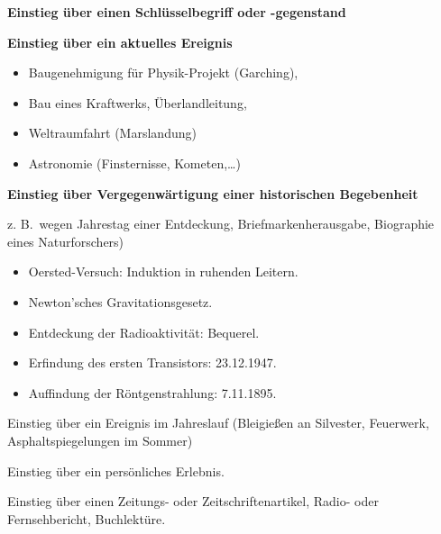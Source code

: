 \begin{itemize}
	
	\item {\bf 	Einstieg \"{u}ber einen Schl\"{u}sselbegriff oder -gegenstand}
	
	\item {\bf 	Einstieg \"{u}ber ein aktuelles Ereignis}
	\begin{beisp2}
			\begin{itemize}
	\item
	Baugenehmigung f\"{u}r Physik-Projekt (Garching),
	\item
	Bau eines Kraftwerks, \"{U}berlandleitung,
	\item
	Weltraumfahrt (Marslandung)
	\item
	Astronomie (Finsternisse, Kometen,\dots)
	\end{itemize}
	\end{beisp2}

	
	\item {\bf 	Einstieg \"{u}ber Vergegenw\"{a}rtigung einer historischen Begebenheit}
	\begin{beisp2}
		z. B.\ wegen Jahrestag einer Entdeckung, Briefmarkenherausgabe,
	Biographie eines Naturforschers)
				\begin{itemize}
	\item
	Oersted-Versuch: Induktion in ruhenden Leitern.
	\item
	Newton'sches Gravitationsgesetz.
	\item
	Entdeckung der Radioaktivit\"{a}t: Bequerel.
	\item
	Erfindung des ersten Transistors: 23.12.1947.
	\item
	Auffindung der R\"{o}ntgenstrahlung: 7.11.1895.
	\end{itemize}
	\end{beisp2}
	

	{\bf
	\item
	Einstieg \"{u}ber ein Ereignis im Jahreslauf
	(Bleigie{\ss}en an Silvester, Feuerwerk, Asphaltspiegelungen im Sommer)
	
	\item
	Einstieg \"{u}ber ein pers\"{o}nliches Erlebnis.
	
	\item
	Einstieg \"{u}ber einen Zeitungs- oder Zeitschriftenartikel, Radio- oder Fernsehbericht, Buchlekt\"{u}re.}

\end{itemize}

